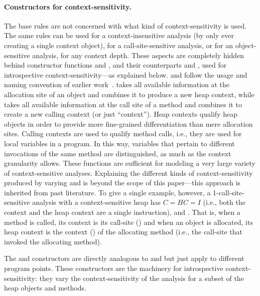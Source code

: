 \paragraph{Constructors for context-sensitivity.}
  The base rules are not concerned with what kind of
  context-sensitivity is used. The same rules can be used for a
  context-insensitive analysis (by only ever creating a single context
  object), for a call-site-sensitive analysis, or for an
  object-sensitive analysis, for any context depth. These aspects are
  completely hidden behind constructor functions  and
  , and their counterparts 
  and , used for introspective
  context-sensitivity---as explained below.   and
   follow the usage and naming convention of earlier
  work~\cite{pointsto-popl11,hybrid-pldi13}.  takes
  all available information at the allocation site of an object and
  combines it to produce a new heap context, while 
  takes all available information at the call site of a method and
  combines it to create a new calling context (or just ``context'').
  Heap contexts qualify heap objects in order to provide more
  fine-grained differentiation than mere allocation sites.  Calling
  contexts are used to qualify method calls, i.e., they are used for
  local variables in a program. In this way, variables that pertain to
  different invocations of the same method are distinguished, as much
  as the context granularity allows.  These functions are sufficient
  for modeling a very large variety of context-sensitive
  analyses. Explaining the different kinds of context-sensitivity
  produced by varying  and  is beyond
  the scope of this paper---this approach is inherited from past
  literature\cite{pointsto-popl11, hybrid-pldi13}.  To give a single
  example, however, a 1-call-site-sensitive analysis with a
  context-sensitive heap has $C = HC = I$ (i.e., both the context and
  the heap context are a single instruction),  and . That is, when a method is called, its context is
  its call-site () and when an object is allocated, its
  heap context is the context () of the allocating method
  (i.e., the call-site that invoked the allocating method).

  The  and 
  constructors are directly analogous to  and
   but just apply to different program points. These
  constructors are the machinery for introspective
  context-sensitivity: they vary the context-sensitivity of the
  analysis for a subset of the heap objects and methods.


